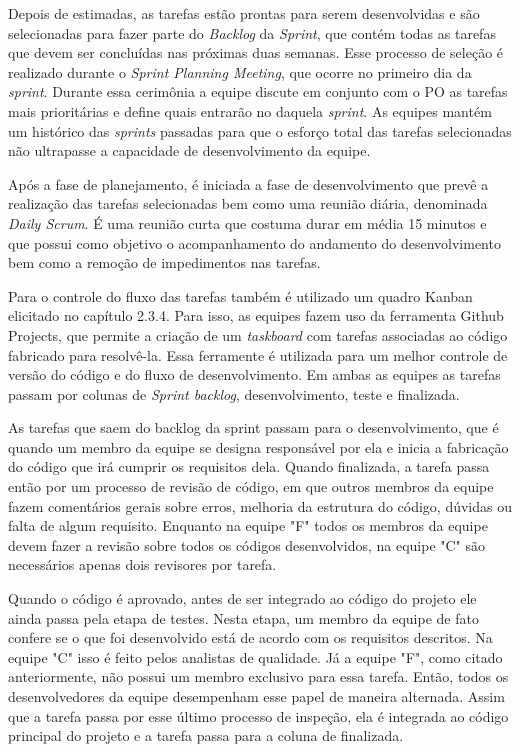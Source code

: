 \documentclass[
    12pt,       %
    openright,      %
    twoside,      %
    a4paper,      %
    english,      %
    french,       %
    spanish,      %
    brazil,       %
    ]{abntex2}
\begin{document}
Depois de estimadas, as tarefas estão prontas para serem desenvolvidas e são selecionadas para fazer parte do \textit{Backlog} da \textit{Sprint}, que contém todas as tarefas que devem ser concluídas nas próximas duas semanas. Esse processo de seleção é realizado durante o \textit{Sprint Planning Meeting}, que ocorre no primeiro dia da \textit{sprint}. Durante essa cerimônia a equipe discute em conjunto com o PO as tarefas mais prioritárias e define quais entrarão no  daquela \textit{sprint}. As equipes mantém um histórico das \textit{sprints} passadas para que o esforço total das tarefas selecionadas não ultrapasse a capacidade de desenvolvimento da equipe. 

Após a fase de planejamento, é iniciada a fase de desenvolvimento que prevê a realização das tarefas selecionadas bem como uma reunião diária, denominada \textit{Daily Scrum}. É uma reunião curta que costuma durar em média 15 minutos e que possui como objetivo o acompanhamento do andamento do desenvolvimento bem como a remoção de impedimentos nas tarefas.

Para o controle do fluxo das tarefas também é utilizado um quadro Kanban elicitado no capítulo 2.3.4. Para isso, as equipes fazem uso da ferramenta Github Projects, que permite a criação de um \textit{taskboard} com tarefas associadas ao código fabricado para resolvê-la. Essa ferramente é utilizada para um melhor controle de versão do código e do fluxo de desenvolvimento. Em ambas as equipes as tarefas passam por colunas de \textit{Sprint backlog}, desenvolvimento, teste e finalizada.

As tarefas que saem do backlog da sprint passam para o desenvolvimento, que é quando um membro da equipe se designa responsável por ela e inicia a fabricação do código que irá cumprir os requisitos dela. Quando finalizada, a tarefa passa então por um processo de revisão de código, em que outros membros da equipe fazem comentários gerais sobre erros, melhoria da estrutura do código, dúvidas ou falta de algum requisito. Enquanto na equipe "F" todos os membros da equipe devem fazer a revisão sobre todos os códigos desenvolvidos, na equipe "C" são necessários apenas dois revisores por tarefa.

Quando o código é aprovado, antes de ser integrado ao código do projeto ele ainda passa pela etapa de testes. Nesta etapa, um membro da equipe de fato confere se o que foi desenvolvido está de acordo com os requisitos descritos. Na equipe "C" isso é feito pelos analistas de qualidade. Já a equipe "F", como citado anteriormente, não possui um membro exclusivo para essa tarefa. Então, todos os desenvolvedores da equipe desempenham esse papel de maneira alternada. Assim que a tarefa passa por esse último processo de inspeção, ela é integrada ao código principal do projeto e a tarefa passa para a coluna de finalizada. 
\end{document}
